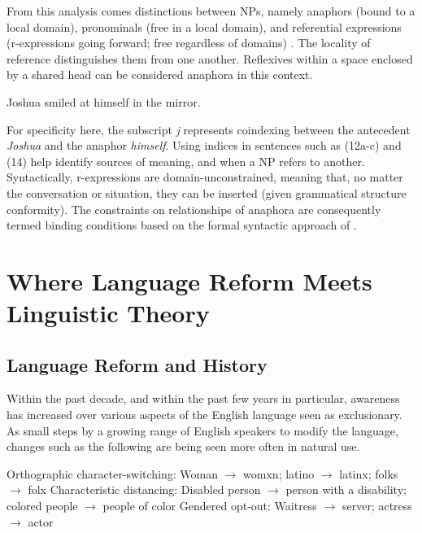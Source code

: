 \documentclass{article}
\begin{document}
From this analysis comes distinctions between NPs, namely anaphors (bound to a local domain), pronominals (free in a local domain), and referential expressions (r-expressions going forward; free regardless of domains) \citep{Huang13}. The locality of reference distinguishes them from one another. Reflexives within a space enclosed by a shared head can be considered anaphora in this context.

\ea
    Joshua smiled at himself in the mirror.
\z
 
For specificity here, the subscript \textit{j} represents coindexing between the antecedent \textit{Joshua} and the anaphor \textit{himself}. Using indices in sentences such as (12a-c) and (14) help identify sources of meaning, and when a NP refers to another. Syntactically, r-expressions are domain-unconstrained, meaning that, no matter the conversation or situation, they can be inserted (given grammatical structure conformity). The constraints on relationships of anaphora are consequently termed binding conditions based on the formal syntactic approach of \citet{Chomsky95}.
\section{Where Language Reform Meets Linguistic Theory}

\subsection{Language Reform and History}
Within the past decade, and within the past few years in particular, awareness has increased over various aspects of the English language seen as exclusionary. As small steps by a growing range of English speakers to modify the language, changes such as the following are being seen more often in natural use.

\ea 
    \begin{xlist}
        \ex Orthographic character-switching: Woman $\rightarrow$ womxn; latino $\rightarrow$ latinx; folks $\rightarrow$ folx
        \ex Characteristic distancing: Disabled person $\rightarrow$ person with a disability; colored people $\rightarrow$ people of color
        \ex Gendered opt-out: Waitress $\rightarrow$ server; actress $\rightarrow$ actor
    \end{xlist}
\z
\end{document}
